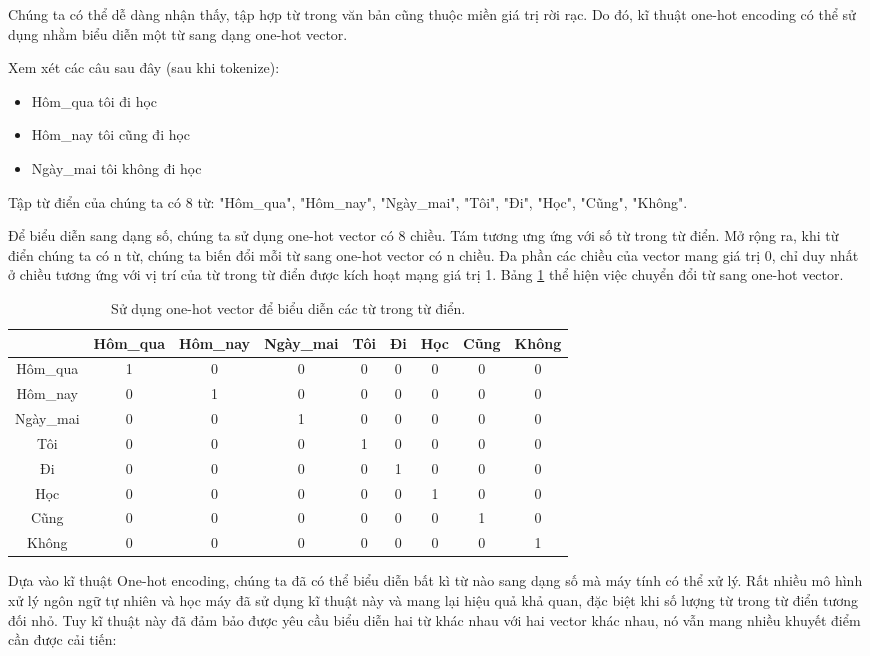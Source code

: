 Chúng ta có thể dễ dàng nhận thấy, tập hợp từ trong văn bản cũng thuộc miền giá trị rời rạc. Do đó, kĩ thuật one-hot encoding có thể sử dụng nhằm biểu diễn một từ sang dạng one-hot vector.

Xem xét các câu sau đây (sau khi tokenize):
\begin{itemize}
    \item Hôm\_qua tôi đi học
    \item Hôm\_nay tôi cũng đi học
    \item Ngày\_mai tôi không đi học
\end{itemize}

Tập từ điển của chúng ta có 8 từ: "Hôm\_qua", "Hôm\_nay", "Ngày\_mai", "Tôi", "Đi", "Học", "Cũng", "Không". 

Để biểu diễn sang dạng số, chúng ta sử dụng one-hot vector có 8 chiều. Tám tương ưng ứng với số từ trong từ điển. Mở rộng ra, khi từ điển chúng ta có n từ, chúng ta biến đổi mỗi từ sang one-hot vector có n chiều. Đa phần các chiều của vector mang giá trị 0, chỉ duy nhất ở chiều tương ứng với vị trí của từ trong từ điển được kích hoạt mạng giá trị 1. Bảng \ref{table:one-hot-vector-from-dict} thể hiện việc chuyển đổi từ sang one-hot vector.

\begin{table}[h!]
    \centering
    \begin{tabular}{ |c|c|c|c|c|c|c|c|c| } 
    \hline
         & Hôm\_qua & Hôm\_nay & Ngày\_mai & Tôi & Đi & Học & Cũng & Không \\
    \hline
        Hôm\_qua & 1 & 0 & 0 & 0 & 0 & 0 & 0 & 0 \\
        Hôm\_nay & 0 & 1 & 0 & 0 & 0 & 0 & 0 & 0\\
        Ngày\_mai & 0 & 0 & 1 & 0 & 0 & 0 & 0 & 0\\
        Tôi & 0 & 0 & 0 & 1 & 0 & 0 & 0 & 0\\
        Đi & 0 & 0 & 0 & 0 & 1 & 0 & 0 & 0\\
        Học & 0 & 0 & 0 & 0 & 0 & 1 & 0 & 0\\
        Cũng & 0 & 0 & 0 & 0 & 0 & 0 & 1 & 0\\
        Không & 0 & 0 & 0 & 0 & 0 & 0 & 0 & 1 \\
    \hline
    \end{tabular}
    \caption{Sử dụng one-hot vector để biểu diễn các từ trong từ điển.}
    \label{table:one-hot-vector-from-dict}
\end{table}

Dựa vào kĩ thuật One-hot encoding, chúng ta đã có thể biểu diễn bất kì từ nào sang dạng số mà máy tính có thể xử lý. Rất nhiều mô hình xử lý ngôn ngữ tự nhiên và học máy đã sử dụng kĩ thuật này và mang lại hiệu quả khả quan, đặc biệt khi số lượng từ trong từ điển tương đối nhỏ. Tuy kĩ thuật này đã đảm bảo được yêu cầu biểu diễn hai từ khác nhau với hai vector khác nhau, nó vẫn mang nhiều khuyết điểm cần được cải tiến:

